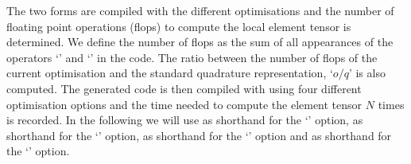 The two forms are compiled with the different \ffc{} optimisations and the
number of floating point operations (flops) to compute the local element
tensor is determined.
We define the number of flops as the sum of all appearances of the operators
`\emp{+}' and `\emp{*}' in the code.
The ratio between the number of flops of the current \ffc{} optimisation
and the standard quadrature representation, `$o/q$' is also computed.
The generated code is then compiled with  using four different
optimisation options and the time needed to compute the element tensor $N$
times is recorded.
In the following we will use  as shorthand for the
`' option,  as shorthand for the
`' option,  as shorthand for the
`' option and  as shorthand for the
`' option.

